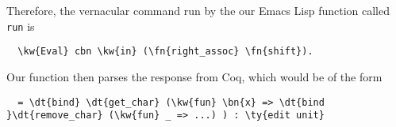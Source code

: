 \documentclass[acmlarge]{acmart}
\newcommand\fakeslant[1]{%
  \special{pdf: literal 1 0 0.167 1 0 0 cm}#1\special{pdf: literal 1 0 -0.167 1 0 0 cm}}
\newcommand{\IdrisData}[1]{\textcolor{IdrisRed}{#1}}
\newcommand{\IdrisType}[1]{\textcolor{IdrisBlue}{#1}}
\newcommand{\IdrisBound}[1]{\textcolor{IdrisLilac}{\fakeslant{#1}}}
\newcommand{\IdrisFunction}[1]{\textcolor{IdrisGreen}{#1}}
\newcommand{\IdrisKeyword}[1]{{\textbf{#1}}}
\newcommand{\ty}[1]{\IdrisType{\texttt{#1}}}
\newcommand{\kw}[1]{\IdrisKeyword{\texttt{#1}}}
\newcommand{\fn}[1]{\IdrisFunction{\texttt{#1}}}
\newcommand{\dt}[1]{\IdrisData{\texttt{#1}}}
\newcommand{\bn}[1]{\IdrisBound{\texttt{#1}}}
\newcommand{\mt}[1]{\mbox{\texttt{#1}}}
\newcommand{\TODO}[1]{{\color{red}{[TODO: #1]}}}
\begin{document}
Therefore, the vernacular command run by the our Emacs Lisp function called \fn{run} is
\begin{Verbatim}
  \kw{Eval} cbn \kw{in} (\fn{right_assoc} \fn{shift}).
\end{Verbatim}
Our function then parses the response from Coq, which would be of the form
\begin{Verbatim}
  = \dt{bind} \dt{get_char} (\kw{fun} \bn{x} => \dt{bind }\dt{remove_char} (\kw{fun} _ => ...) ) : \ty{edit unit}
\end{Verbatim}







\end{document}
